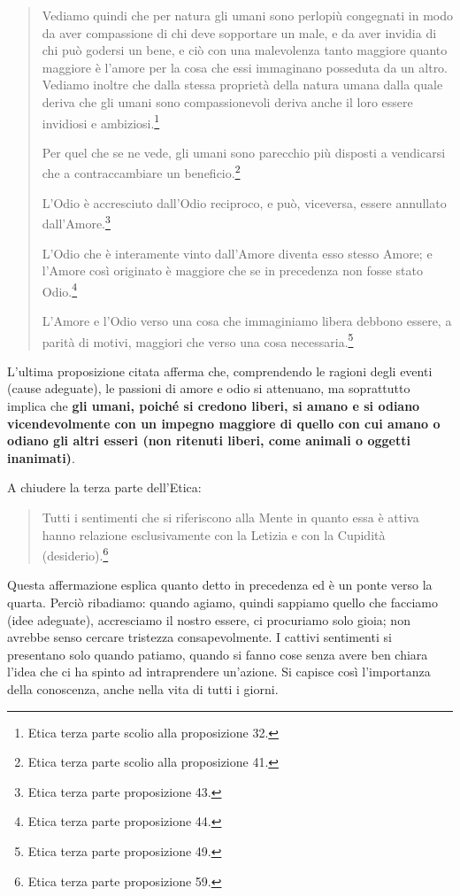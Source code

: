 \begin{quotation}
	\small Vediamo quindi che per natura gli umani sono perlopiù congegnati in modo da aver compassione di chi deve sopportare un male, e da aver invidia di chi può godersi
	un bene, e ciò con una malevolenza tanto maggiore quanto maggiore è
	l’amore per la cosa che essi immaginano posseduta da un altro. Vediamo inoltre che dalla
	stessa proprietà della natura umana dalla quale deriva che gli umani sono compassionevoli
	deriva anche il loro essere invidiosi e ambiziosi.\footnote{Etica terza parte scolio alla proposizione 32.}
	
 Per quel che se ne vede, gli umani
	sono parecchio più disposti a vendicarsi che a contraccambiare un beneficio.\footnote{Etica terza parte scolio alla proposizione 41.}
	
	L’Odio è accresciuto dall’Odio reciproco, e può, viceversa, essere annullato dall’Amore.\footnote{Etica terza parte proposizione 43.}
	
	L’Odio che è interamente vinto dall’Amore diventa esso stesso Amore; e l’Amore così originato è maggiore che se in precedenza non fosse stato Odio.\footnote{Etica terza parte proposizione 44.}
	
	L’Amore e l’Odio verso una cosa che immaginiamo libera debbono essere, a parità di motivi, maggiori che verso una cosa necessaria.\footnote{Etica terza parte proposizione 49.}
\end{quotation}

L'ultima proposizione citata afferma che, comprendendo le ragioni degli eventi (cause adeguate), le passioni di amore e odio si attenuano, ma soprattutto implica che \textbf{gli umani, poiché si credono liberi, si amano e si odiano vicendevolmente con un impegno maggiore di quello con cui amano o odiano gli altri esseri (non ritenuti liberi, come animali o oggetti inanimati)}.

A chiudere la terza parte dell'Etica:

\begin{quotation}
	\small Tutti i sentimenti che si riferiscono alla Mente in quanto essa è attiva hanno relazione
	esclusivamente con la Letizia e con la Cupidità (desiderio).\footnote{Etica terza parte proposizione 59.}
\end{quotation}

Questa affermazione esplica quanto detto in precedenza ed è un ponte verso la quarta. Perciò ribadiamo: quando agiamo, quindi sappiamo quello che facciamo (idee adeguate), accresciamo il nostro essere, ci procuriamo solo gioia; non avrebbe senso cercare tristezza consapevolmente. I cattivi sentimenti si presentano solo quando patiamo, quando si fanno cose senza avere ben chiara l'idea che ci ha spinto ad intraprendere un'azione. Si capisce così l'importanza della conoscenza, anche nella vita di tutti i giorni.

